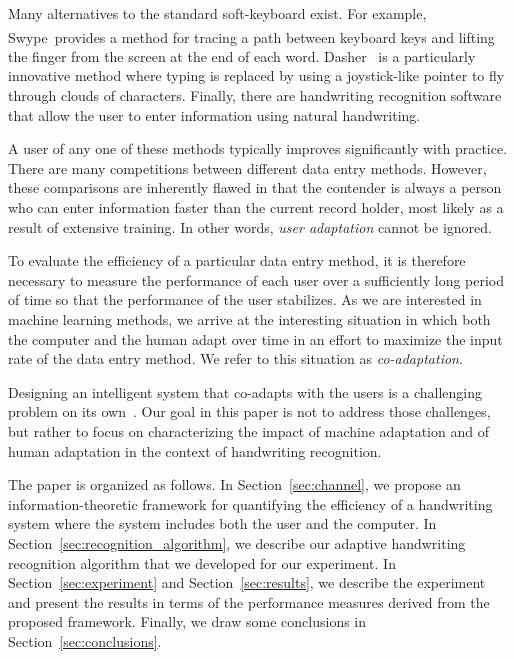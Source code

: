 \documentclass{sigchi}
\begin{document}
\newcommand{\tm}{\textsuperscript{\textregistered}~}

Many alternatives to the standard soft-keyboard exist. For example,
Swype\tm provides a method for tracing a path between keyboard keys
and lifting the finger from the screen at the end of each
word. Dasher~\cite{Garrett2003} is a particularly innovative method
where typing is replaced by using a joystick-like pointer to fly
through clouds of characters. Finally, there are handwriting
recognition software that allow the user to enter information using
natural handwriting.

A user of any one of these methods typically improves significantly
with practice. There are many competitions between different data
entry methods. However, these comparisons are inherently flawed in
that the contender is always a person who can enter information faster
than the current record holder, most likely as a result of extensive
training. In other words, {\em user adaptation} cannot be ignored.

To evaluate the efficiency of a particular data entry method, it is
therefore necessary to measure the performance of each user over a
sufficiently long period of time so that the performance of the user
stabilizes. As we are interested in machine learning methods, we arrive
at the interesting situation in which both the computer and the human
adapt over time in an effort to maximize the input rate of the
data entry method. We refer to this situation as {\em co-adaptation}.

Designing an intelligent system that co-adapts with the users is a
challenging problem on its own~\cite{Hook2000, Maes1994, Lim2009a}.
Our goal in this paper is not to address those challenges, but rather
to focus on characterizing the impact of machine adaptation and of
human adaptation in the context of handwriting recognition.
 
The paper is organized as follows. In Section~\ref{sec:channel}, we
propose an information-theoretic framework for quantifying the
efficiency of a handwriting system where the system includes both the
user and the computer. In Section~\ref{sec:recognition_algorithm}, we
describe our adaptive handwriting recognition algorithm that we
developed for our experiment. In Section~\ref{sec:experiment} and
Section~\ref{sec:results}, we describe the experiment and present the
results in terms of the performance measures derived from the proposed
framework. Finally, we draw some conclusions in
Section~\ref{sec:conclusions}.
\end{document}
